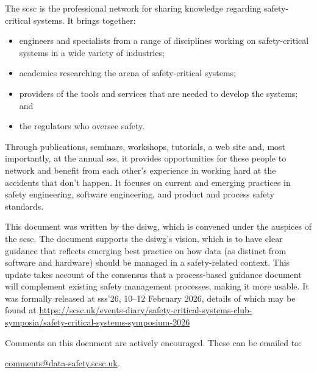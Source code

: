 \clearpage
\pagestyle{ContinuationInsideFrontCover}
The \gls{scsc} is the professional network for sharing knowledge regarding safety-critical systems. It brings together: 
\begin{itemize}
	\item engineers and specialists from a range of disciplines working on safety-critical systems in a wide variety of industries;
	\item academics researching the arena of safety-critical systems;
	\item providers of the tools and services that are needed to develop the systems; and
	\item the regulators who oversee safety.
\end{itemize}

Through publications, seminars, workshops, tutorials, a web site and, most importantly, at the annual \gls{sss}, it provides opportunities for these people to network and benefit from each other’s experience in working hard at the accidents that don’t happen. It focuses on current and emerging practices in safety engineering, software engineering, and product and process safety standards.

This document was written by the \gls{dsiwg}, which is convened under the auspices of the \gls{scsc}. The document supports the \gls{dsiwg}'s vision, which is to have clear guidance that reflects emerging best practice on how data (as distinct from software and hardware) should be managed in a safety-related context. This update takes account of the consensus that a process-based guidance document will complement existing safety management processes, making it more usable. It was formally released at
\gls{sss}'26, 10--12 February 2026,
details of which may be found at
\href{https://scsc.uk/events-diary/safety-critical-systems-club-symposia/safety-critical-systems-symposium-2026}{https://scsc.uk/events-diary/safety-critical-systems-club-symposia/safety-critical-systems-symposium-2026}%

Comments on this document are actively encouraged. These can be emailed to: 
\begin{center}
	\href{mailto:comments@data-safety.scsc.uk}{comments@data-safety.scsc.uk}.
\end{center}

